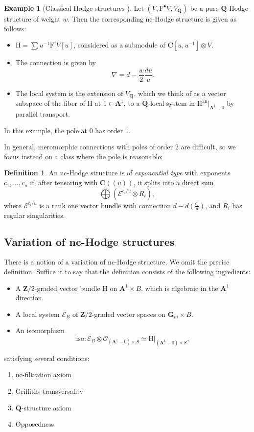 \documentclass[11pt, reqno]{amsart}
\numberwithin{equation}{section}
\theoremstyle{plain}
\theoremstyle{definition}
\newtheorem{definition}[theorem]{Definition}
\newtheorem{example}[theorem]{Example}
\theoremstyle{italicsname}
\newcommand{\an}{\mathrm{an}}
\newcommand{\cO}{\mathcal{O}}
\newcommand{\cE}{\mathcal{E}}
\newcommand{\rF}{\mathrm{F}}
\newcommand{\rH}{\mathrm{H}}
\newcommand{\bA}{\mathbf{A}}
\newcommand{\bC}{\mathbf{C}}
\newcommand{\bG}{\mathbf{G}}
\newcommand{\bZ}{\mathbf{Z}}
\newcommand{\bQ}{\mathbf{Q}}
\begin{document}
\begin{example}[Classical Hodge structures ]
    Let $(V, \rF^\bullet V, V_{\bQ})$ be a pure $\bQ$-Hodge structure of weight $w$. Then the corresponding nc-Hodge structure is given as follows:
    \begin{itemize}
        \item $\rH = \sum u^{-1} \rF^i V[u]$, considered as a submodule of $\bC[u,u^{-1}] \otimes V$.
        \item The connection is given by 
        \[
            \nabla = d - \frac{w}{2} \frac{du}{u}.
        \]
        \item The local system is the extension of $V_{\bQ}$, which we think of as a vector subspace of the fiber of $\rH$ at $1 \in \bA^1$, to a $\bQ$-local system in $\rH^\an|_{\bA^1 - 0}$ by parallel transport.
    \end{itemize}
    In this example, the pole at $0$ has order $1$.
\end{example}

In general, meromorphic connections with poles of order $2$ are difficult, so we focus instead on a class where the pole is reasonable:

\begin{definition}
\label{def:exponential-type}
    An nc-Hodge structure is of \emph{exponential type} with exponents $c_1, \dots, c_n$ if, after tensoring with $\bC((u))$, it splits into a direct sum  
    \[
        \bigoplus (\cE^{c_i/u} \otimes R_i),
    \]
    where $\cE^{c_i/u}$ is a rank one vector bundle with connection $d - d\left( \frac{c_i}{u} \right)$, and $R_i$ has regular singularities. 
\end{definition}


\subsection*{Variation of nc-Hodge structures}
There is a notion of a variation of nc-Hodge structure. We omit the precise definition. Suffice it to say that the definition consists of the following ingredients:
\begin{itemize}
    \item A $\bZ/2$-graded vector bundle $\rH$ on $\bA^1 \times B$, which is algebraic in the $\bA^1$ direction.
    \item A local system $\cE_B$ of $\bZ/2$-graded vector spaces on $\bG_m \times B$.
    \item An isomorphism 
    \[
        \mathrm{iso}:\cE_B \otimes \cO_{(\bA^1 - 0) \times S} \simeq \rH|_{(\bA^1 - 0) \times S},
    \]
\end{itemize}
satisfying several conditions:
\begin{enumerate} [label = (\arabic*)]
    \item nc-filtration axiom
    \item Griffiths transversality
    \item $\bQ$-structure axiom
    \item Opposedness 
\end{enumerate}
\end{document}

